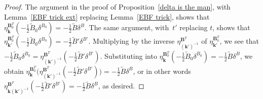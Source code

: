 \documentclass{amsart}
\theoremstyle{definition}
\theoremstyle{remark}
\numberwithin{equation}{section}
\newcommand{\0}{{\mathbf{0}}}
\newcommand{\kk}{{\boldsymbol{k}}}
\newcommand{\tB}{{\widetilde{B}}}
\newcommand{\BB}{\mathbf{B}}
\begin{document}
\begin{proof}
The argument in the proof of Proposition~\ref{delta is the man}, with Lemma~\ref{EBF trick ext} replacing Lemma~\ref{EBF trick}, shows that $\eta^{\BB_0^T}_\kk(-\frac12\tB_0\delta^{B_0})=-\frac12\tB\delta^B$.
%
%
%
%
The same argument, with~$t'$ replacing $t$, shows that $\eta^{\BB_0^T}_{\kk'}(-\frac12\tB_0\delta^{B_0})=-\frac12\tB'\delta^{B'}$.
Multiplying by the inverse $\eta^{\BB^T}_{(\kk')^{-1}}$ of $\eta^{\BB_0^T}_{\kk'}$, we see that $-\frac12\tB_0\delta^{B_0}=\eta^{\BB^T}_{(\kk')^{-1}}(-\frac12\tB'\delta^{B'})$.
Substituting into $\eta^{\BB_0^T}_\kk(-\frac12\tB_0\delta^{B_0})=-\frac12\tB\delta^B$, we obtain $\eta^{\BB_0^T}_\kk\big(\eta^{\BB^T}_{(\kk')^{-1}}(-\frac12\tB'\delta^{B'})\big)=-\frac12\tB\delta^B$, or in other words $\eta^{\BB^T}_{\kk(\kk')^{-1}}(-\frac12\tB'\delta^{B'})=-\frac12\tB\delta^B$, as desired.
\end{proof}
\end{document}
